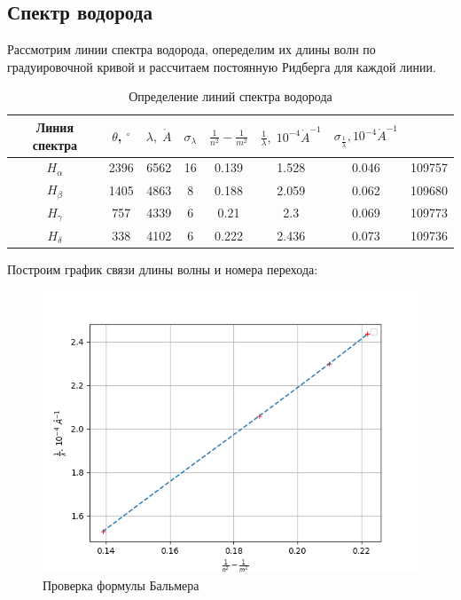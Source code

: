 \documentclass[a4paper, 12pt]{article}%
\begin{document}
\subsection{Спектр водорода}

	Рассмотрим линии спектра водорода, опеределим их длины волн по градуировочной кривой и рассчитаем постоянную Ридберга для каждой линии.
	
	\newpage
	
		\begin{table}[h!]
		\begin{center}
			\begin{tabular}{|c|c|c|c|c|c|c|c|}
				\hline 
				Линия спектра & $ \theta $, $ ^\circ $ & $ \lambda, \;\mathring{A} $ & $ \sigma_{\lambda} $ & $ \frac{1}{n^2} - \frac{1}{m^2} $ & $ \frac{1}{\lambda}, \;  10^{-4} \mathring{A}^{-1} $  &  $ \sigma_{\frac{1}{\lambda}}, 10^{-4} \mathring{A}^{-1} $ \\ 
			\hline $ H_\alpha $ & 2396 & 6562 & 16 & 0.139 & 1.528 & 0.046 & 109757 \\
		\hline $ H_\beta $  & 1405 & 4863 & 8 & 0.188 & 2.059 & 0.062 & 109680\\
			\hline $ H_\gamma $ & 757 & 4339 & 6 & 0.21 & 2.3 & 0.069 & 109773\\
			\hline $ H_\delta $ & 338 & 4102 & 6 & 0.222 & 2.436 & 0.073 & 109736\\
				\hline 
			\end{tabular} 
		\end{center}
		\caption{Определение линий спектра водорода}
		\label{table_mn}
	\end{table}
	
	Построим график связи длины волны и номера перехода:

	\begin{figure}[!h]
		\begin{center}
		\includegraphics[scale=0.9]{3.png}
		\end{center}		
		\caption{Проверка формулы Бальмера}
		\label{graf_mn}
	\end{figure} 
	
\end{document}
